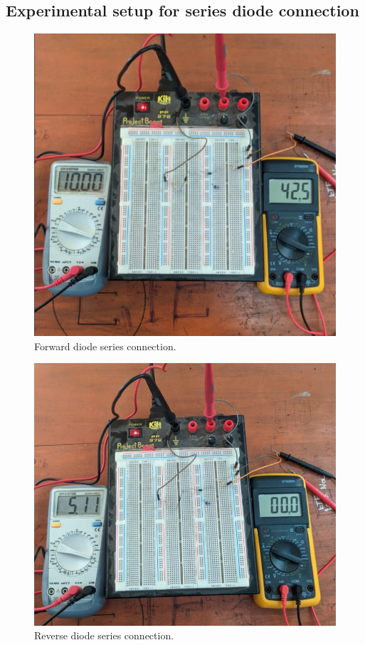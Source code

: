 \subsection{Experimental setup for series diode connection}
\begin{figure}[H]
    \centering
    \includegraphics[scale=0.3]{src/exp03/ser1.png}
    \caption{Forward diode series connection.}
\end{figure}
\begin{figure}[H]
    \centering
    \includegraphics[scale=0.3]{src/exp03/ser2.png}
    \caption{Reverse diode series connection.}
\end{figure}
